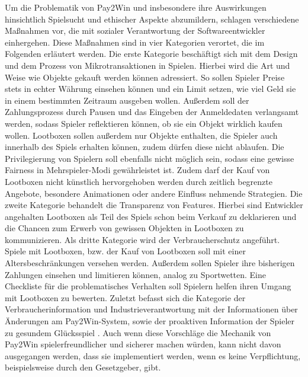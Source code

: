 Um die Problematik von Pay2Win und insbesondere ihre Auswirkungen hinsichtlich Spielsucht und ethischer Aspekte abzumildern, schlagen \cite{King2018} verschiedene Maßnahmen vor, die mit sozialer Verantwortung der Softwareentwickler einhergehen. Diese Maßnahmen sind in vier Kategorien verortet, die im Folgenden erläutert werden. Die erste Kategorie beschäftigt sich mit dem Design und dem Prozess von Mikrotransaktionen in Spielen. Hierbei wird die Art und Weise wie Objekte gekauft werden können adressiert. So sollen Spieler Preise stets in echter Währung einsehen können und ein Limit setzen, wie viel Geld sie in einem bestimmten Zeitraum ausgeben wollen. Außerdem soll der Zahlungsprozess durch Pausen und das Eingeben der Anmeldedaten verlangsamt werden, sodass Spieler reflektieren können, ob sie ein Objekt wirklich kaufen wollen. Lootboxen sollen außerdem nur Objekte enthalten, die Spieler auch innerhalb des Spiels erhalten können, zudem dürfen diese nicht ablaufen. Die Privilegierung von Spielern soll ebenfalls nicht möglich sein, sodass eine gewisse Fairness in Mehrspieler-Modi gewährleistet ist. Zudem darf der Kauf von Lootboxen nicht künstlich hervorgehoben werden durch zeitlich begrenzte Angebote, besondere Animationen oder andere Einfluss nehmende Strategien. Die zweite Kategorie behandelt die Transparenz von Features. Hierbei sind Entwickler angehalten Lootboxen als Teil des Spiels schon beim Verkauf zu deklarieren und die Chancen zum Erwerb von gewissen Objekten in Lootboxen zu kommunizieren. Als dritte Kategorie wird der Verbraucherschutz angeführt. Spiele mit Lootboxen, bzw. der Kauf von Lootboxen soll mit einer Altersbeschränkungen versehen werden. Außerdem sollen Spieler ihre bisherigen Zahlungen einsehen und limitieren können, analog zu Sportwetten. Eine Checkliste für die problematisches Verhalten soll Spielern helfen ihren Umgang mit Lootboxen zu bewerten. Zuletzt befasst sich die Kategorie der Verbraucherinformation und Industrieverantwortung mit der Informationen über Änderungen am Pay2Win-System, sowie der proaktiven Information der Spieler zu gesundem Glücksspiel \citep[S. 169 ff.]{King2018}. Auch wenn diese Vorschläge die Mechanik von Pay2Win spielerfreundlicher und sicherer machen würden, kann nicht davon ausgegangen werden, dass sie implementiert werden, wenn es keine Verpflichtung, beispielsweise durch den Gesetzgeber, gibt.

